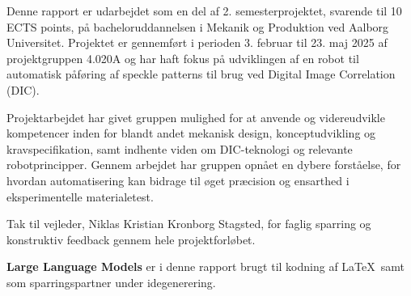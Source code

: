 Denne rapport er udarbejdet som en del af 2. semesterprojektet, svarende til 10 ECTS points, på bacheloruddannelsen i Mekanik og Produktion ved Aalborg Universitet. Projektet er gennemført i perioden 3. februar til 23. maj 2025 af projektgruppen 4.020A og har haft fokus på udviklingen af en robot til automatisk påføring af speckle patterns til brug ved Digital Image Correlation (DIC). 

Projektarbejdet har givet gruppen mulighed for at anvende og videreudvikle kompetencer inden for blandt andet mekanisk design, konceptudvikling og kravspecifikation, samt indhente viden om DIC-teknologi og relevante robotprincipper. Gennem arbejdet har gruppen opnået en dybere forståelse, for hvordan automatisering kan bidrage til øget præcision og ensarthed i eksperimentelle materialetest. 

Tak til vejleder, Niklas Kristian Kronborg Stagsted, for faglig sparring og konstruktiv feedback gennem hele projektforløbet. 


\textbf{Large Language Models} er i denne rapport brugt til kodning af \LaTeX \, samt som sparringspartner under idegenerering.


